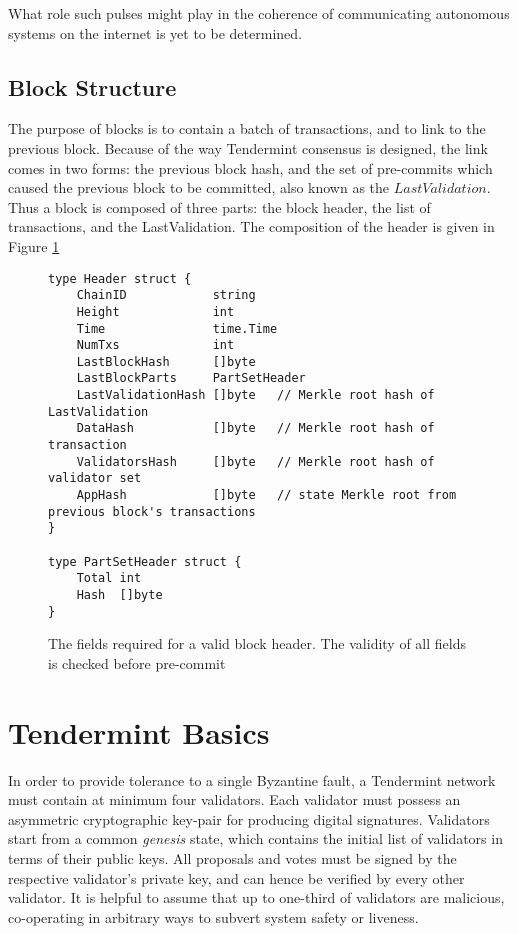 What role such pulses might play in the coherence of communicating autonomous systems on the internet is yet to be determined.

\subsection{Block Structure}

The purpose of blocks is to contain a batch of transactions, and to link to the previous block.
Because of the way Tendermint consensus is designed, the link comes in two forms: the previous block hash,
and the set of pre-commits which caused the previous block to be committed, also known as the $LastValidation$.
Thus a block is composed of three parts: the block header, the list of transactions, and the LastValidation.
The composition of the header is given in Figure \ref{fig:header}

\begin{figure}[]
\begin{verbatim}
type Header struct {
	ChainID            string        
	Height             int           
	Time               time.Time     
	NumTxs             int           
	LastBlockHash      []byte        
	LastBlockParts     PartSetHeader 
	LastValidationHash []byte   // Merkle root hash of LastValidation
	DataHash           []byte   // Merkle root hash of transaction 
	ValidatorsHash     []byte   // Merkle root hash of validator set
	AppHash            []byte   // state Merkle root from previous block's transactions
}

type PartSetHeader struct {
	Total int    
	Hash  []byte 
}
\end{verbatim}
	\caption[Block Header Structure]{The fields required for a valid block header. The validity of all fields is checked before pre-commit}
	\label{fig:header}
\end{figure}

\section{Tendermint Basics}

In order to provide tolerance to a single Byzantine fault, a Tendermint network must contain at minimum four validators.
Each validator must possess an asymmetric cryptographic key-pair for producing digital signatures.
Validators start from a common \emph{genesis} state, which contains the initial list of validators in terms of their public keys.
All proposals and votes must be signed by the respective validator's private key, and can hence be verified by every other validator.
It is helpful to assume that up to one-third of validators are malicious, co-operating in arbitrary ways to subvert system safety or liveness.

